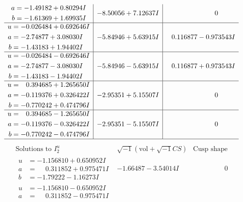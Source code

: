 \documentclass[1p]{elsarticle_modified}
\theoremstyle{definition}
\newcommand{\I}{\sqrt{-1}}
\begin{document}
$$\begin{array}{c|c|c}
\begin{aligned}
a &= -1.49182 + 0.80294 I \\
b &= -1.61369 + 1.69935 I\end{aligned}
 & -8.50056 + 7.12637 I & \phantom{-0.000000 } 0 \\ \hline\begin{aligned}
u &= -0.026484 + 0.692646 I \\
a &= -2.74877 + 3.08030 I \\
b &= -1.43183 + 1.94402 I\end{aligned}
 & -5.84946 + 5.63915 I & \phantom{-}0.116877 - 0.973543 I \\ \hline\begin{aligned}
u &= -0.026484 - 0.692646 I \\
a &= -2.74877 - 3.08030 I \\
b &= -1.43183 - 1.94402 I\end{aligned}
 & -5.84946 - 5.63915 I & \phantom{-}0.116877 + 0.973543 I \\ \hline\begin{aligned}
u &= \phantom{-}0.394685 + 1.265650 I \\
a &= -0.119376 + 0.326422 I \\
b &= -0.770242 + 0.474796 I\end{aligned}
 & -2.95351 + 5.15507 I & \phantom{-0.000000 } 0 \\ \hline\begin{aligned}
u &= \phantom{-}0.394685 - 1.265650 I \\
a &= -0.119376 - 0.326422 I \\
b &= -0.770242 - 0.474796 I\end{aligned}
 & -2.95351 - 5.15507 I & \phantom{-0.000000 } 0\\
 \hline 
 \end{array}$$\newpage$$\begin{array}{c|c|c}  
\text{Solutions to }I^u_{2}& \I (\text{vol} + \sqrt{-1}CS) & \text{Cusp shape}\\
 \hline 
\begin{aligned}
u &= -1.156810 + 0.650952 I \\
a &= \phantom{-}0.311852 + 0.975471 I \\
b &= -1.79222 - 1.16273 I\end{aligned}
 & -1.66487 - 3.54014 I & \phantom{-0.000000 } 0 \\ \hline\begin{aligned}
u &= -1.156810 - 0.650952 I \\
a &= \phantom{-}0.311852 - 0.975471 I \\

\end{aligned}
\end{array}$$
\end{document}
